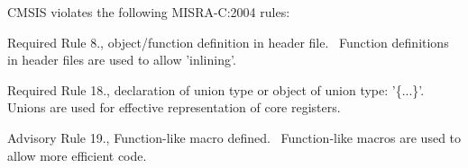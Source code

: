 C\+M\+S\+I\+S violates the following M\+I\+S\+R\+A-\/\+C\+:2004 rules\+:

\begin{DoxyItemize}
\item Required Rule 8., object/function definition in header file.~\newline
 Function definitions in header files are used to allow 'inlining'.\end{DoxyItemize}
\begin{DoxyItemize}
\item Required Rule 18., declaration of union type or object of union type\+: '\{...\}'.~\newline
 Unions are used for effective representation of core registers.\end{DoxyItemize}
\begin{DoxyItemize}
\item Advisory Rule 19., Function-\/like macro defined.~\newline
 Function-\/like macros are used to allow more efficient code. \end{DoxyItemize}
